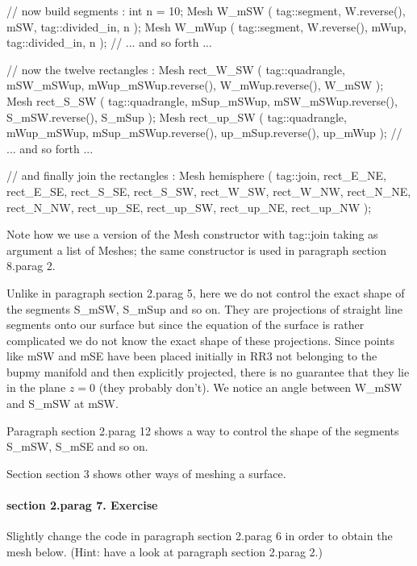 \verbatim
   // now build segments :
   int n = 10;
   Mesh W_mSW  ( tag::segment, W.reverse(), mSW,  tag::divided_in, n );
   Mesh W_mWup ( tag::segment, W.reverse(), mWup, tag::divided_in, n );
   // ... and so forth ...

   // now the twelve rectangles :
   Mesh rect_W_SW  ( tag::quadrangle,
      mSW_mSWup, mWup_mSWup.reverse(), W_mWup.reverse(), W_mSW );
   Mesh rect_S_SW  ( tag::quadrangle,
      mSup_mSWup, mSW_mSWup.reverse(), S_mSW.reverse(), S_mSup );
   Mesh rect_up_SW ( tag::quadrangle,
      mWup_mSWup, mSup_mSWup.reverse(), up_mSup.reverse(), up_mWup );
   // ... and so forth ...

   // and finally join the rectangles :
   Mesh hemisphere ( tag::join,
      { rect_E_NE, rect_E_SE, rect_S_SE, rect_S_SW, rect_W_SW, rect_W_NW,
        rect_N_NE, rect_N_NW, rect_up_SE, rect_up_SW, rect_up_NE, rect_up_NW } );
\endverbatim

Note how we use a version of the {\codett Mesh} constructor with {\codett tag::join} taking as
argument a list of {\codett Mesh}es; the same constructor is used in paragraph \numb section
8.\numb parag 2.

Unlike in paragraph \numb section 2.\numb parag 5, here we do not control the
exact shape of the segments {\codett S\_mSW}, {\codett S\_mSup} and so on.
They are projections of straight line segments onto our surface but since the equation
of the surface is rather complicated we do not know the exact shape of these projections.
Since points like {\codett mSW} and {\codett mSE} have been placed initially in {\codett RR3}
not belonging to the {\codett bupmy} manifold and then explicitly {\codett project}ed,
there is no guarantee that they lie in the plane $ z = 0 $ (they probably don't).
We notice an angle between {\codett W\_mSW} and {\codett S\_mSW} at {\codett mSW}.

Paragraph \numb section 2.\numb parag 12 shows a way to control the shape of the segments
{\codett S\_mSW}, {\codett S\_mSE} and so on.

Section \numb section 3 shows other ways of meshing a surface.


\paragraph{\numb section 2.\numb parag 7. Exercise}

Slightly change the code in paragraph \numb section 2.\numb parag 6
in order to obtain the mesh below.
(Hint: have a look at paragraph \numb section 2.\numb parag 2.)

